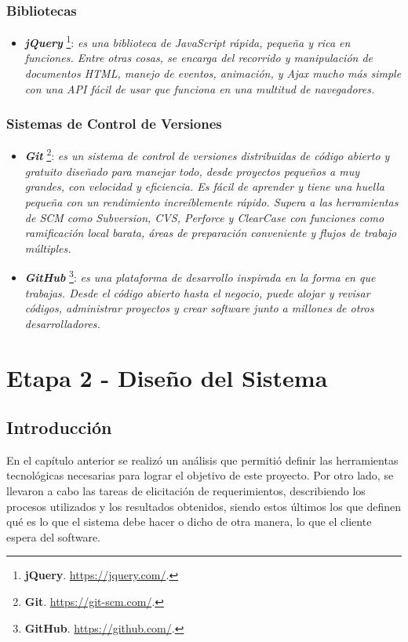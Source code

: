 \documentclass[11pt,oneside]{book}
\begin{document}
\subsubsection{Bibliotecas}
\begin{itemize}
\item \textit{\textbf{jQuery}} \footnote{\textbf{jQuery}. \url{https://jquery.com/}.}: \textit{es una biblioteca de JavaScript rápida, pequeña y rica en funciones. Entre otras cosas, se encarga del recorrido y manipulación de documentos HTML, manejo de eventos, animación, y Ajax mucho más simple con una API fácil de usar que funciona en una multitud de navegadores.}
\end{itemize}

\newpage
\subsubsection{Sistemas de Control de Versiones}
\begin{itemize}
\item \textit{\textbf{Git}} \footnote{\textbf{Git}. \url{https://git-scm.com/}.}: \textit{es un sistema de control de versiones distribuidas de código abierto y gratuito diseñado para manejar todo, desde proyectos pequeños a muy grandes, con velocidad y eficiencia. Es fácil de aprender y tiene una huella pequeña con un rendimiento increíblemente rápido. Supera a las herramientas de SCM como Subversion, CVS, Perforce y ClearCase con funciones como ramificación local barata, áreas de preparación conveniente y flujos de trabajo múltiples.}

\item \textit{\textbf{GitHub}} \footnote{\textbf{GitHub}. \url{https://github.com/}.}: \textit{es una plataforma de desarrollo inspirada en la forma en que trabajas. Desde el código abierto hasta el negocio, puede alojar y revisar códigos, administrar proyectos y crear software junto a millones de otros desarrolladores.}
\end{itemize}

\clearpage
\newpage
\section{Etapa 2 - Diseño del Sistema} \label{capitulo2}

\subsection{Introducción}
En el capítulo anterior se realizó un análisis que permitió definir las herramientas tecnológicas necesarias para lograr el objetivo de este proyecto. Por otro lado, se llevaron a cabo las tareas de elicitación de requerimientos, describiendo los procesos utilizados y los resultados obtenidos, siendo estos últimos los que definen qué es lo que el sistema debe hacer o dicho de otra manera, lo que el cliente espera del software. 
\end{document}
